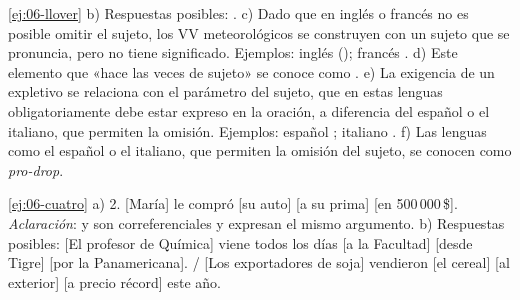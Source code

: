 \begin{solucion}{\ref{ej:06-llover}}
b) Respuestas posibles: . c) Dado que en inglés o francés no es posible omitir el
sujeto, los VV meteorológicos se construyen con un sujeto que se pronuncia, pero
no tiene significado. Ejemplos: inglés  (); francés
. d) Este elemento que «hace las veces de sujeto» se conoce como
. e) La exigencia de un expletivo se relaciona con el
parámetro del sujeto, que en estas lenguas obligatoriamente debe estar expreso
en la oración, a diferencia del español o el italiano, que permiten la omisión.
Ejemplos: español ; italiano . f) Las lenguas como el
español o el italiano, que permiten la omisión del sujeto, se conocen como
\textit{pro-drop}.
\end{solucion}

\begin{solucion}{\ref{ej:06-cuatro}}
a) 2. [María] le compró [su auto] [a su prima] [en 500\,000\,\$].
\textit{Aclaración}:  y  son correferenciales y
expresan el mismo argumento. b) Respuestas posibles: [El profesor de Química]
viene todos los días [a la Facultad] [desde Tigre] [por la Panamericana]. / [Los
exportadores de soja] vendieron [el cereal] [al exterior] [a precio récord] este
año.
\end{solucion}
